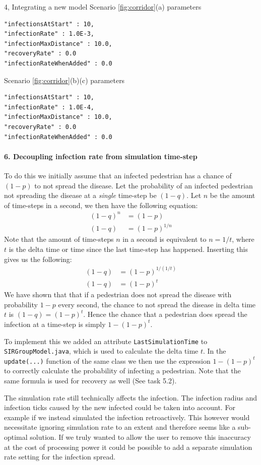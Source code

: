 \begin{task}{4, Integrating a new model}
\noindent Scenario \ref{fig:corridor}(a) parameters
\begin{verbatim}
"infectionsAtStart" : 10,
"infectionRate" : 1.0E-3,
"infectionMaxDistance" : 10.0,
"recoveryRate" : 0.0
"infectionRateWhenAdded" : 0.0
\end{verbatim}
Scenario \ref{fig:corridor}(b)(c) parameters
\begin{verbatim}
"infectionsAtStart" : 10,
"infectionRate" : 1.0E-4,
"infectionMaxDistance" : 10.0,
"recoveryRate" : 0.0
"infectionRateWhenAdded" : 0.0
\end{verbatim}


\paragraph{6. Decoupling infection rate from simulation time-step}
To do this we initially assume that an infected pedestrian has a chance of $(1-p)$ to not spread the disease. Let the probability of an infected pedestrian not spreading the disease at a \textit{single} time-step be $(1-q)$. Let $n$ be the amount of time-steps in a second, we then have the following equation:
\begin{align}
    (1-q)^n &=(1-p)\\
    (1-q) &= (1-p)^{1/n}
\end{align}
Note that the amount of time-steps $n$ in a second is equivalent to $n = 1/t$, where $t$ is the delta time or time since the last time-step has happened. Inserting this gives us the following:
\begin{align}
    (1-q) &= (1-p)^{1/(1/t)}\\
    (1-q) &= (1-p)^t
\end{align}
We have shown that that if a pedestrian does not spread the disease with probability $1-p$ every second, the chance to not spread the disease in delta time $t$ is $(1-q) = (1-p)^t$. Hence the chance that a pedestrian does spread the infection at a time-step is simply $1-(1-p)^t$.

To implement this we added an attribute \verb+LastSimulationTime+ to \verb+SIRGroupModel.java+, which is used to calculate the delta time $t$. In the \verb+update(...)+ function of the same class we then use the expression $1-(1-p)^t$ to correctly calculate the probability of infecting a pedestrian. Note that the same formula is used for recovery as well (See task 5.2).

The simulation rate still technically affects the infection. The infection radius and infection ticks caused by the new infected could be taken into account. For example if we instead simulated the infection retroactively. This however would necessitate ignoring simulation rate to an extent and therefore seems like a sub-optimal solution. If we truly wanted to allow the user to remove this inaccuracy at the cost of processing power it could be possible to add a separate simulation rate setting for the infection spread.




\end{task}
